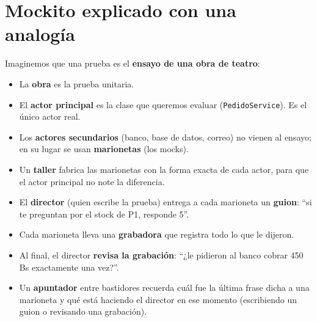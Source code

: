 \documentclass[11pt,a4paper,oneside]{report}
\newcommand{\code}[1]{\texttt{#1}}
\begin{document}
\section{Mockito explicado con una analogía}
Imaginemos que una prueba es el \textbf{ensayo de una obra de teatro}:

\begin{itemize}
  \item La \textbf{obra} es la prueba unitaria.
  \item El \textbf{actor principal} es la clase que queremos evaluar (\code{PedidoService}). Es el único actor real.
  \item Los \textbf{actores secundarios} (banco, base de datos, correo) no vienen al ensayo; en su lugar se usan \textbf{marionetas} (los mocks).
  \item Un \textbf{taller} fabrica las marionetas con la forma exacta de cada actor, para que el actor principal no note la diferencia.
  \item El \textbf{director} (quien escribe la prueba) entrega a cada marioneta un \textbf{guion}: ``si te preguntan por el stock de P1, responde 5''.
  \item Cada marioneta lleva una \textbf{grabadora} que registra todo lo que le dijeron.
  \item Al final, el director \textbf{revisa la grabación}: ``¿le pidieron al banco cobrar 450 Bs exactamente una vez?''.
  \item Un \textbf{apuntador} entre bastidores recuerda cuál fue la última frase dicha a una marioneta y qué está haciendo el director en ese momento (escribiendo un guion o revisando una grabación).
\end{itemize}
\end{document}
